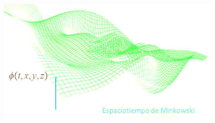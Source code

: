 \color{Black}
\vspace{10mm}

\begin{figure}[H]
	\centering
	\includegraphics[width=.95\textwidth]{imagenes/img29-06.png}
\end{figure}


